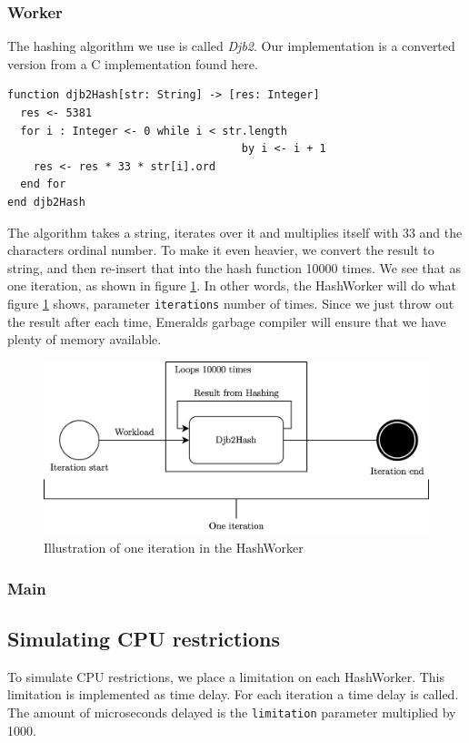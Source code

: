 \subsubsection{Worker}
The hashing algorithm we use is called \textit{Djb2}. Our implementation is a converted version from a C implementation found here\cite{noauthor_hash_nodate}.
\begin{lstlisting}[language=emerald]
function djb2Hash[str: String] -> [res: Integer]
  res <- 5381
  for i : Integer <- 0 while i < str.length 
                                    by i <- i + 1
    res <- res * 33 * str[i].ord
  end for
end djb2Hash
\end{lstlisting}
The algorithm takes a string, iterates over it and multiplies itself with 33 and the characters ordinal number. To make it even heavier, we convert the result to string, and then re-insert that into the hash function 10000 times. We see that as one iteration, as shown in figure \ref{fig:Hashing_algorithm_iteration}. In other words, the HashWorker will do what figure \ref{fig:Hashing_algorithm_iteration} shows, parameter \verb|iterations| number of times. Since we just throw out the result after each time, Emeralds garbage compiler will ensure that we have plenty of memory available. 
\begin{figure}[t]
    \centering
    \includegraphics[scale=0.9]{chapters/implementation/figures/Iteration.png}
    \caption{Illustration of one iteration in the HashWorker}
    \label{fig:Hashing_algorithm_iteration}
\end{figure}




\subsubsection{Main}



\subsection{Simulating CPU restrictions}
To simulate CPU restrictions, we place a limitation on each HashWorker. This limitation is implemented as time delay. For each iteration a time delay is called. The amount of microseconds delayed is the \verb|limitation| parameter multiplied by 1000. 






